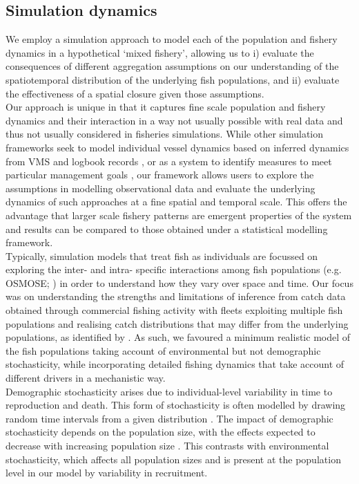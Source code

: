 \documentclass[review]{elsarticle}
\begin{document}
\subsection{Simulation dynamics}
 
We employ a simulation approach to model each of the population and fishery
dynamics in a hypothetical `mixed fishery', allowing us to i) evaluate the
consequences of different aggregation assumptions on our understanding of the
spatiotemporal distribution of the underlying fish populations, and ii)
evaluate the effectiveness of a spatial closure given those assumptions. \\

Our approach is unique in that it captures fine scale population and fishery
dynamics and their interaction in a way not usually possible with real data and
thus not usually considered in fisheries simulations. While other simulation
frameworks seek to model individual vessel dynamics based on inferred dynamics
from VMS and logbook records \citep{Bastardie2010}, or as a system to identify
measures to meet particular management goals \citep{Bailey2018}, our framework
allows users to explore the assumptions in modelling observational data and
evaluate the underlying dynamics of such approaches at a fine spatial and
temporal scale.  This offers the advantage that larger scale fishery patterns
are emergent properties of the system and results can be compared to those
obtained under a statistical modelling framework. \\

Typically, simulation models that treat fish as individuals are focussed on
exploring the inter- and intra- specific interactions among fish populations
(e.g. OSMOSE; \cite{Shin2004}) in order to understand how they vary over space
and time. Our focus was on understanding the strengths and limitations of
inference from catch data obtained through commercial fishing activity with
fleets exploiting multiple fish populations and realising catch distributions
that may differ from the underlying populations, as identified by
\cite{Gillis2008}. As such, we favoured a minimum realistic model of the fish
populations \citep{Plaganyi2014} taking account of environmental but not
demographic stochasticity, while incorporating detailed fishing dynamics that
take account of different drivers in a mechanistic way.  \\ 

Demographic stochasticity arises due to individual-level variability in time to
reproduction and death. This form of stochasticity is often modelled by drawing
random time intervals from a given distribution \citep{Gillespie1977}. The
impact of demographic stochasticity depends on the population size, with the
effects expected to decrease with increasing population size \citep{Lande2010}.
This contrasts with environmental stochasticity, which affects all population
sizes and is present at the population level in our model by variability in
recruitment. \\
\end{document}
